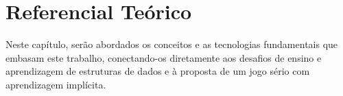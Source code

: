 \chapter{Referencial Teórico}

Neste capítulo, serão abordados os conceitos e as tecnologias fundamentais que
embasam este trabalho, conectando-os diretamente aos desafios de ensino e
aprendizagem de estruturas de dados e à proposta de um jogo sério com
aprendizagem implícita.






